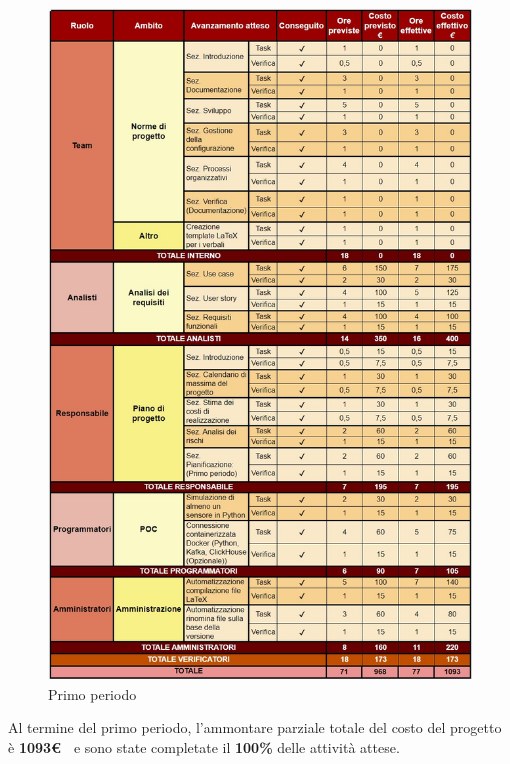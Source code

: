 \begin{figure}[H]
    \centering
    \includegraphics[height=1.0\textwidth]{../Images/periodo1.jpg}
    \caption{Primo periodo}
    \label{fig:1periodo}
\end{figure}

Al termine del primo periodo, l'ammontare parziale totale del costo del progetto è \textbf{ 1093\euro\ } e sono state completate il \textbf{100\%} delle attività attese.

